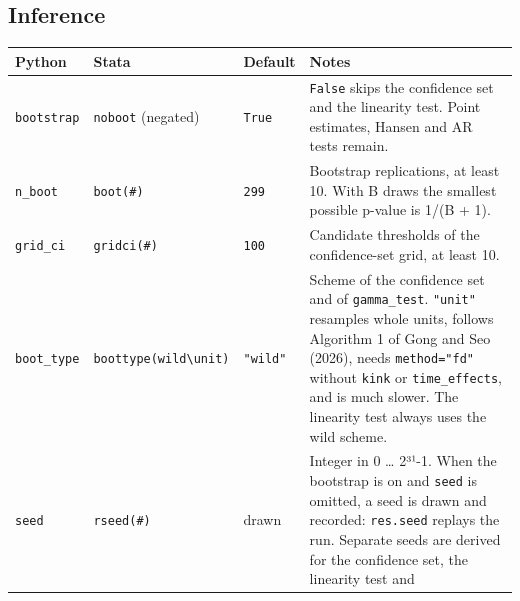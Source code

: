 \documentclass[
  10.5pt,
  a4paper,
]{article}
\newcounter{none} %
\begin{document}
\subsection{Inference}\label{inference}

{\def\LTcaptype{none} %
\begin{longtable}[]{@{}
  >{\raggedright\arraybackslash}p{}
  >{\raggedright\arraybackslash}p{}
  >{\raggedright\arraybackslash}p{}
  >{\raggedright\arraybackslash}p{}@{}}
\toprule\noalign{}
\begin{minipage}[b]{\linewidth}\raggedright
Python
\end{minipage} & \begin{minipage}[b]{\linewidth}\raggedright
Stata
\end{minipage} & \begin{minipage}[b]{\linewidth}\raggedright
Default
\end{minipage} & \begin{minipage}[b]{\linewidth}\raggedright
Notes
\end{minipage} \\
\midrule\noalign{}
\endhead
\bottomrule\noalign{}
\endlastfoot
\texttt{bootstrap} & \texttt{noboot} (negated) & \texttt{True} &
\texttt{False} skips the confidence set and the linearity test. Point
estimates, Hansen and AR tests remain. \\
\texttt{n\_boot} & \texttt{boot(\#)} & \texttt{299} & Bootstrap
replications, at least 10. With B draws the smallest possible p-value is
1/(B + 1). \\
\texttt{grid\_ci} & \texttt{gridci(\#)} & \texttt{100} & Candidate
thresholds of the confidence-set grid, at least 10. \\
\texttt{boot\_type} &
\texttt{boottype(wild\textbackslash{}\textbar{}unit)} & \texttt{"wild"}
& Scheme of the confidence set and of \texttt{gamma\_test}.
\texttt{"unit"} resamples whole units, follows Algorithm 1 of Gong and
Seo (2026), needs \texttt{method="fd"} without \texttt{kink} or
\texttt{time\_effects}, and is much slower. The linearity test always
uses the wild scheme. \\
\texttt{seed} & \texttt{rseed(\#)} & drawn & Integer in 0 \ldots{}
2³¹-1. When the bootstrap is on and \texttt{seed} is omitted, a seed is
drawn and recorded: \texttt{res.seed} replays the run. Separate seeds
are derived for the confidence set, the linearity test and

\end{longtable}}
\end{document}
